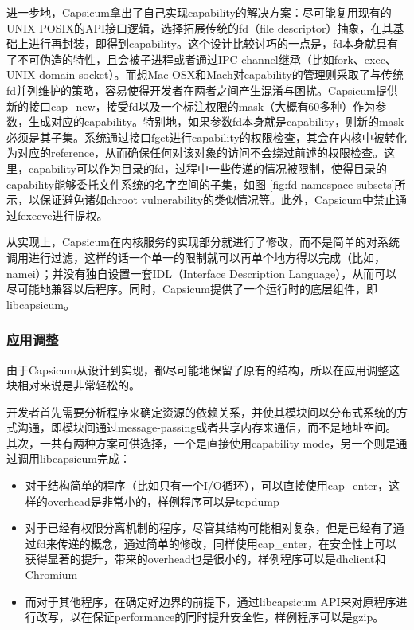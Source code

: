 \documentclass[final,12pt]{elsarticle}
\begin{document}
进一步地，Capsicum拿出了自己实现capability的解决方案：尽可能复用现有的UNIX POSIX的API接口逻辑，选择拓展传统的fd（file descriptor）抽象，在其基础上进行再封装，即得到capability。这个设计比较讨巧的一点是，fd本身就具有了不可伪造的特性，且会被子进程或者通过IPC channel继承（比如fork、exec、UNIX domain socket）。而想Mac OSX和Mach对capability的管理则采取了与传统fd并列维护的策略，容易使得开发者在两者之间产生混淆与困扰。Capsicum提供新的接口cap\_new，接受fd以及一个标注权限的mask（大概有60多种）作为参数，生成对应的capability。特别地，如果参数fd本身就是capability，则新的mask必须是其子集。系统通过接口fget进行capability的权限检查，其会在内核中被转化为对应的reference，从而确保任何对该对象的访问不会绕过前述的权限检查。这里，capability可以作为目录的fd，过程中一些传递的情况被限制，使得目录的capability能够委托文件系统的名字空间的子集，如图 \ref{fig:fd-namespace-subsets}所示，以保证避免诸如chroot vulnerability的类似情况等。此外，Capsicum中禁止通过fexecve进行提权。

从实现上，Capsicum在内核服务的实现部分就进行了修改，而不是简单的对系统调用进行过滤，这样的话一个单一的限制就可以再单个地方得以完成（比如，namei）；并没有独自设置一套IDL（Interface Description Language），从而可以尽可能地兼容以后程序。同时，Capsicum提供了一个运行时的底层组件，即libcapsicum。

\subsubsection{应用调整}
\label{sss:adoption}

由于Capsicum从设计到实现，都尽可能地保留了原有的结构，所以在应用调整这块相对来说是非常轻松的。

开发者首先需要分析程序来确定资源的依赖关系，并使其模块间以分布式系统的方式沟通，即模块间通过message-passing或者共享内存来通信，而不是地址空间。其次，一共有两种方案可供选择，一个是直接使用capability mode，另一个则是通过调用libcapsicum完成：
\begin{itemize}
	\item
	对于结构简单的程序（比如只有一个I/O循环），可以直接使用cap\_enter，这样的overhead是非常小的，样例程序可以是tcpdump
	\item
	对于已经有权限分离机制的程序，尽管其结构可能相对复杂，但是已经有了通过fd来传递的概念，通过简单的修改，同样使用cap\_enter，在安全性上可以获得显著的提升，带来的overhead也是很小的，样例程序可以是dhclient和Chromium
	\item
	而对于其他程序，在确定好边界的前提下，通过libcapsicum API来对原程序进行改写，以在保证performance的同时提升安全性，样例程序可以是gzip。
\end{itemize}
\end{document}

